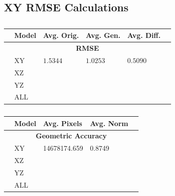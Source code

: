 \documentclass[12pt, fleqn, titlepage]{article}
\begin{document}
\subsection{XY RMSE Calculations}
\begin{table}[H]
	\begin{center}
		\begin{tabular}{l l l l l l}
			\toprule
			& \textbf{Model} & \textbf{Avg. Orig.} & \textbf{Avg. Gen.} & \textbf{Avg. Diff.} & \\ \midrule
			&                        \multicolumn{4}{c}{\textbf{RMSE}}                          & \\
			&XY                & $1.5344$            & $1.0253$           & $0.5090$            & \\
			&XZ                &                     &                    &                     & \\
			&YZ                &                     &                    &                     & \\
			&ALL               &                     &                    &                     & \\
			 \bottomrule
		\end{tabular}
		\caption{}
		\label{tab:metrics}
	\end{center}
\end{table}

\begin{table}[H]
	\begin{center}
		\begin{tabular}{l l l l l}
			\toprule
			& \textbf{Model}   & \textbf{Avg. Pixels} & \textbf{Avg. Norm}  & \\ \midrule
			&      \multicolumn{3}{c}{\textbf{Geometric Accuracy}}          & \\
			&XY                & 14678174.659         & 0.8749              & \\
			&XZ                &                      &                     & \\
			&YZ                &                      &                     & \\
			&ALL               &                      &                     & \\
			\bottomrule
		\end{tabular}
		\caption{}
		\label{tab:metrics}
	\end{center}
\end{table}
\end{document}
